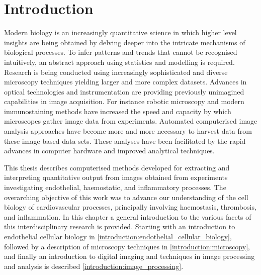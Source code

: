 \chapter{Introduction}
\label{introduction}
\ifpdf
	\graphicspath{{chapter_1/figs/}}
\fi


Modern biology is an increasingly quantitative science in which higher level insights are being obtained by delving deeper into the intricate mechanisms of biological processes. To infer patterns and trends that cannot be recognised intuitively, an abstract approach using statistics and modelling is required. Research is being conducted using increasingly sophisticated and diverse microscopy techniques yielding larger and more complex datasets. Advances in optical technologies and instrumentation are providing previously unimagined capabilities in image acquisition. For instance robotic microscopy and modern immunostaining methods have increased the speed and capacity by which microscopes gather image data from experiments. Automated computerised image analysis approaches have become more and more necessary to harvest data from these image based data sets. These analyses have been facilitated by the rapid advances in computer hardware and improved analytical techniques.

This thesis describes computerised methods developed for extracting and interpreting quantitative output from images obtained from experiments investigating endothelial, haemostatic, and inflammatory processes. The overarching objective of this work was to advance our understanding of the cell biology of cardiovascular processes, principally involving haemostasis, thrombosis, and inflammation. In this chapter a general introduction to the various facets of this interdisciplinary research is provided. Starting with an introduction to endothelial cellular biology in \autoref{introduction:endothelial_cellular_biology}, followed by a description of microscopy techniques in \autoref{introduction:microscopy}, and finally an introduction to digital imaging and techniques in image processing and analysis is described \autoref{introduction:image_processing}.

